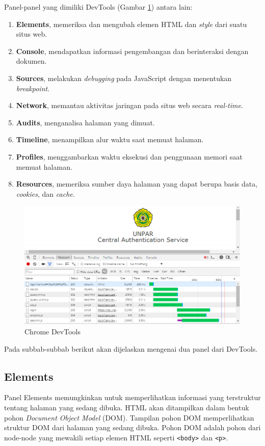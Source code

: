 Panel-panel yang dimiliki DevTools (Gambar \ref{fig:2_chrome_devtools}) antara lain:
\begin{enumerate}
	\item \textbf{Elements}, memeriksa dan mengubah elemen HTML dan \textit{style} dari suatu situs web.
	\item \textbf{Console}, mendapatkan informasi pengembangan dan berinteraksi dengan dokumen.
	\item \textbf{Sources}, melakukan \textit{debugging} pada JavaScript dengan menentukan \textit{breakpoint}.
	\item \textbf{Network}, memantau aktivitas jaringan pada situs web secara \textit{real-time}.
	\item \textbf{Audits}, menganalisa halaman yang dimuat.
	\item \textbf{Timeline}, menampilkan alur waktu saat memuat halaman.
	\item \textbf{Profiles}, menggambarkan waktu eksekusi dan penggunaan memori saat memuat halaman.
	\item \textbf{Resources}, memeriksa sumber daya halaman yang dapat berupa basis data, \textit{cookies}, dan \textit{cache}.
\end{enumerate}

\begin{figure}[H]
	\centering
	\includegraphics[scale=0.5]{Gambar/chrome-devtools}
	\caption{Chrome DevTools} 
	\label{fig:2_chrome_devtools}
\end{figure}

Pada subbab-subbab berikut akan dijelaskan mengenai dua panel dari DevTools.

\subsection{Elements}
Panel Elements memungkinkan untuk memperlihatkan informasi yang terstruktur tentang halaman yang sedang dibuka. HTML akan ditampilkan dalam bentuk pohon \textit{Document Object Model} (DOM). Tampilan pohon DOM memperlihatkan struktur DOM dari halaman yang sedang dibuka. Pohon DOM adalah pohon dari node-node yang mewakili setiap elemen HTML seperti \texttt{<body>} dan \texttt{<p>}. 

